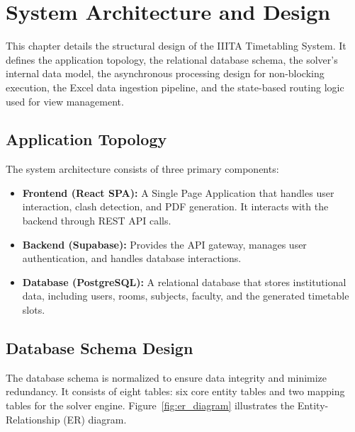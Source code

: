 
\chapter{System Architecture and Design} %

\label{Chapter4} %


This chapter details the structural design of the IIITA Timetabling System. It defines the application topology, the relational database schema, the solver's internal data model, the asynchronous processing design for non-blocking execution, the Excel data ingestion pipeline, and the state-based routing logic used for view management.

\section{Application Topology}

The system architecture consists of three primary components:
\begin{itemize}
    \item \textbf{Frontend (React SPA):} A Single Page Application that handles user interaction, clash detection, and PDF generation. It interacts with the backend through REST API calls.
    \item \textbf{Backend (Supabase):} Provides the API gateway, manages user authentication, and handles database interactions.
    \item \textbf{Database (PostgreSQL):} A relational database that stores institutional data, including users, rooms, subjects, faculty, and the generated timetable slots.
\end{itemize}

\section{Database Schema Design}

The database schema is normalized to ensure data integrity and minimize redundancy. It consists of eight tables: six core entity tables and two mapping tables for the solver engine. Figure~\ref{fig:er_diagram} illustrates the Entity-Relationship (ER) diagram.

